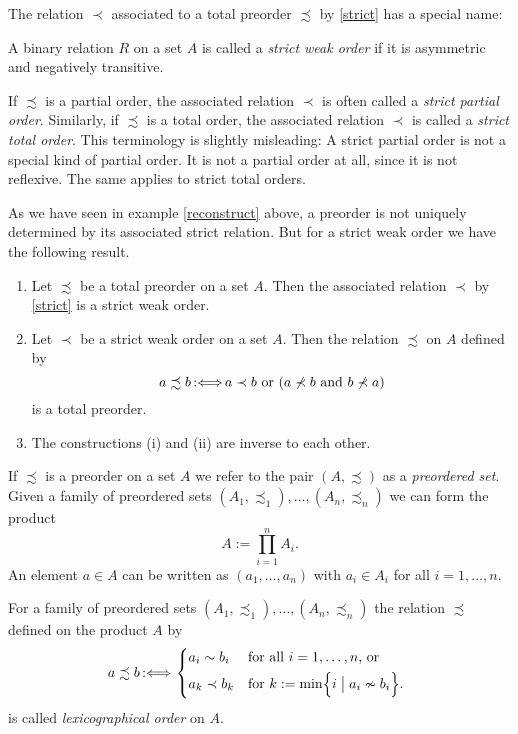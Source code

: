﻿\documentclass[a4paper,11pt,final]{article}
\newcommand{\defby}{\mbox{\ensuremath{\,:\Longleftrightarrow\,}}\xspace}
\numberwithin{equation}{subsection}
\begin{document}
The relation $\prec$ associated to a total preorder $\precsim$ by \ref{strict} has a special name:
\begin{defi}
A binary relation $R$ on a set $A$ is called a \emph{strict weak order} if it is asymmetric and negatively transitive.
\end{defi}

\begin{rem}
If $\precsim$ is a partial order, the associated relation $\prec$ is often called a \emph{strict partial order}. Similarly, if $\precsim$ is a total order, the associated relation $\prec$ is called a \emph{strict total order}. This terminology is slightly misleading: A strict partial order is not a special kind of partial order. It is not a partial order at all, since it is not reflexive. The same applies to strict total orders.
\end{rem}

As we have seen in example \ref{reconstruct} above, a preorder is not uniquely determined by its associated strict relation. But for a strict weak order we have the following result.
\begin{prop}
\begin{enumerate}
\item Let $\precsim$ be a total preorder on a set $A$. Then the associated relation $\prec$ by \ref{strict} is a strict weak order.
\item Let $\prec$ be a strict weak order on a set $A$. Then the relation $\precsim$ on $A$ defined by
\begin{equation*}
a \precsim b\defby a \prec b \text{ or } (a\nprec b\text{ and } b\nprec a)
\end{equation*}
is a total preorder.
\item The constructions (i) and (ii) are inverse to each other.
\end{enumerate}
\end{prop}

If $\precsim$ is a preorder on a set $A$ we refer to the pair $(A,\precsim)$ as a \emph{preordered set}. Given a family of preordered sets $(A_1,\precsim_1),\dotsc,(A_n,\precsim_n)$ we can form the product
\begin{equation*}
A:=\prod_{i=1}^n A_i.
\end{equation*}
An element $a\in A$ can be written as $(a_1,\dotsc,a_n)$ with $a_i\in A_i$ for all $i=1,\dotsc,n$.

\begin{defi}\label{lexorder}
For a family of preordered sets $(A_1,\precsim_1),\dotsc,(A_n,\precsim_n)$ the relation $\precsim$ defined on the product $A$ by
\begin{equation*}
a \precsim b\defby \begin{dcases*}
a_i \sim b_i & for all $i=1,\dotsc,n$, or\\
a_k \prec b_k & for $k:=\min\Bigl\{i\bigm| a_i\nsim b_i\Bigr\}$.
\end{dcases*}
\end{equation*}
is called \emph{lexicographical order} on $A$.
\end{defi}
\end{document}
